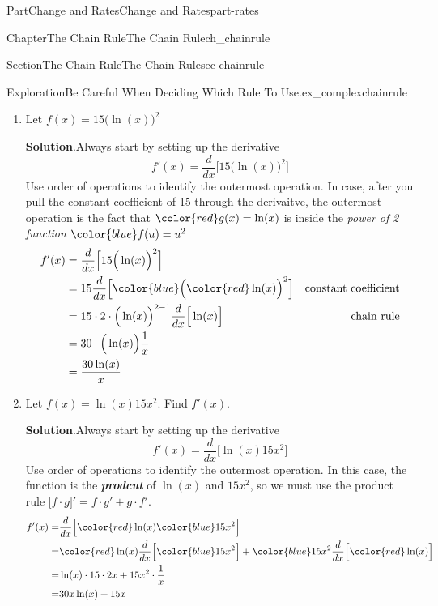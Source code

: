 \documentclass[oneside,10pt,]{tufte-book}
\newcommand{\blocktitlefont}{\relax}
\newcommand{\alert}[1]{\textbf{\textit{#1}}}
\numberwithin{equation}{chapter}
\newcommand{\red}[1]{   {\color{red}   #1}   }
\newcommand{\blue}[1]{  {\color{blue}  #1}  }
\newcommand{\ddx}[1]{ \dfrac{d}{dx} \Big[ #1 \Big]  }
\newcommand{\D}[1]{ \Big[ #1 \Big]'  }
\newcommand{\amp}{&}
\begin{document}
\begin{partptx}{Part}{Change and Rates}{}{Change and Rates}{}{}{part-rates}
\begin{chapterptx}{Chapter}{The Chain Rule}{}{The Chain Rule}{}{}{ch_chainrule}
\begin{sectionptx}{Section}{The Chain Rule}{}{The Chain Rule}{}{}{sec-chainrule}
\begin{enumerate}
\end{enumerate}
%
\begin{exploration}{Exploration}{Be Careful When Deciding Which Rule To Use.}{ex_complexchainrule}%
\begin{enumerate}[font=\bfseries,label=(\alph*),ref=\alph*]%
\item{}Let \(f(x) = 15 \Big( \ln(x)\Big)^2\)%
\par\smallskip%
\noindent\textbf{\blocktitlefont Solution}.\hypertarget{ex_complexchainrule-2-2}{}\quad{}Always start by setting up the derivative%
\begin{equation*}
f'(x) = \ddx{ 15 \Big( \ln(x)\Big)^2}
\end{equation*}
Use order of operations to identify the outermost operation. In case, after you pull the constant coefficient of 15 through the derivaitve, the outermost operation is the fact that \(\red{g(x) = \ln(x)}\) is inside the \emph{power of 2 function} \(\blue{f(u) = u^2}\)%
\begin{align*}
f'(x)  \amp =  \ddx{ 15 \Big( \ln(x)\Big)^2} \\
\amp = 15  \ddx{ \blue{\Big( \red{\ln(x)}\Big)^2}} \amp \text{constant coefficient}\\
\amp = 15\cdot  2\cdot \Big( \ln(x)\Big)^{2-1}\ddx{\ln(x)} \amp \text{chain rule}\\
\amp = 30\cdot \Big( \ln(x)\Big)\dfrac{1}{x} \\
\amp = \dfrac{30\ln(x)}{x}
\end{align*}
%
\item{}Let \(f(x) = \ln(x) 15x^2\). Find \(f'(x)\).%
\par\smallskip%
\noindent\textbf{\blocktitlefont Solution}.\hypertarget{ex_complexchainrule-3-2}{}\quad{}Always start by setting up the derivative%
\begin{equation*}
f'(x) = \ddx{\ln(x) 15x^2}
\end{equation*}
Use order of operations to identify the outermost operation.  In this case, the function is the \alert{prodcut} of \(\ln(x)\) and \(15x^2\), so we must use the product rule \(\D{f\cdot g} = f\cdot g' + g\cdot f' \).%
\begin{align*}
f'(x) = \amp \ddx{ \red{\ln(x)} \blue{15x^2} }\\
= \amp \red{\ln(x)}\ddx{ \blue{15x^2} } + \blue{15x^2} \ddx{ \red{\ln(x)} }\\
= \amp \ln(x)\cdot 15\cdot 2x + 15x^2\cdot \frac{1}{x}\\
= \amp 30 x \ln(x) + 15x
\end{align*}

\end{enumerate}
\end{exploration}
\end{sectionptx}
\end{chapterptx}
\end{partptx}
\end{document}
